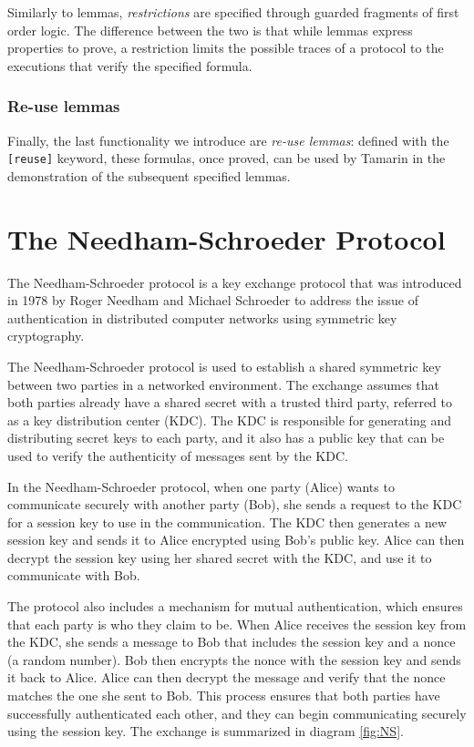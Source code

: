 \documentclass[fleqn,10pt]{SelfArx} %
\begin{document}
Similarly to lemmas, \textit{restrictions} are specified through guarded fragments of first order logic. The difference between the two is that while lemmas express properties to prove, a restriction limits the possible traces of a protocol to the executions that verify the specified formula.

\subsubsection{Re-use lemmas}

Finally, the last functionality we introduce are \textit{re-use lemmas}: defined with the \lstinline|[reuse]| keyword, these formulas, once proved, can be used by Tamarin in the demonstration of the subsequent specified lemmas.

\section{The Needham-Schroeder Protocol}

The Needham-Schroeder protocol is a key exchange protocol that was introduced in 1978 by Roger Needham and Michael Schroeder \cite{needhamschroeder} to address the issue of authentication in distributed computer networks using symmetric key cryptography.

The Needham-Schroeder protocol is used to establish a shared symmetric key between two parties in a networked environment. The exchange assumes that both parties already have a shared secret with a trusted third party, referred to as a key distribution center (KDC). The KDC is responsible for generating and distributing secret keys to each party, and it also has a public key that can be used to verify the authenticity of messages sent by the KDC.

In the Needham-Schroeder protocol, when one party (Alice) wants to communicate securely with another party (Bob), she sends a request to the KDC for a session key to use in the communication. The KDC then generates a new session key and sends it to Alice encrypted using Bob's public key. Alice can then decrypt the session key using her shared secret with the KDC, and use it to communicate with Bob.

The protocol also includes a mechanism for mutual authentication, which ensures that each party is who they claim to be. When Alice receives the session key from the KDC, she sends a message to Bob that includes the session key and a nonce (a random number). Bob then encrypts the nonce with the session key and sends it back to Alice. Alice can then decrypt the message and verify that the nonce matches the one she sent to Bob. This process ensures that both parties have successfully authenticated each other, and they can begin communicating securely using the session key. The exchange is summarized in diagram \ref{fig:NS}.
\end{document}
